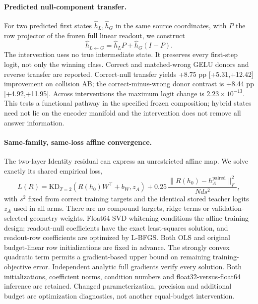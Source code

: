 \paragraph{Predicted null-component transfer.}
For two predicted first states $\hat h_L,\hat h_G$ in the same source coordinates, with $P$ the row projector of the frozen full linear readout, we construct
\[
\hat h_{L\leftarrow G}=\hat h_L P+\hat h_G(I-P).
\]
The intervention uses no true intermediate state. It preserves every first-step logit, not only the winning class. Correct and matched-wrong GELU donors and reverse transfer are reported. Correct-null transfer yields +8.75 pp [+5.31,+12.42] improvement on collision AB; the correct-minus-wrong donor contrast is +8.44 pp [+4.92,+11.95]. Across interventions the maximum logit change is $2.23\times10^{-13}$. This tests a functional pathway in the specified frozen composition; hybrid states need not lie on the encoder manifold and the intervention does not remove all answer information.

\paragraph{Same-family, same-loss affine convergence.}
The two-layer Identity residual can express an unrestricted affine map. We solve exactly its shared empirical loss,
\[
 L(R)=\mathrm{KD}_{T=2}(R(h_0)W^\top+b_W,z_A)+0.25\,\frac{\|R(h_0)-h_A^{\mathrm{paired}}\|_F^2}{Nds^2},
\]
with $s^2$ fixed from correct training targets and the identical stored teacher logits $z_A$ used in all arms. There are no compound targets, ridge terms or validation-selected geometry weights. Float64 SVD whitening conditions the affine training design; readout-null coefficients have the exact least-squares solution, and readout-row coefficients are optimized by L-BFGS. Both OLS and original budget-linear row initializations are fixed in advance. The strongly convex quadratic term permits a gradient-based upper bound on remaining training-objective error. Independent analytic full gradients verify every solution. Both initializations, coefficient norms, condition numbers and float32-versus-float64 inference are retained. Changed parameterization, precision and additional budget are optimization diagnostics, not another equal-budget intervention.

